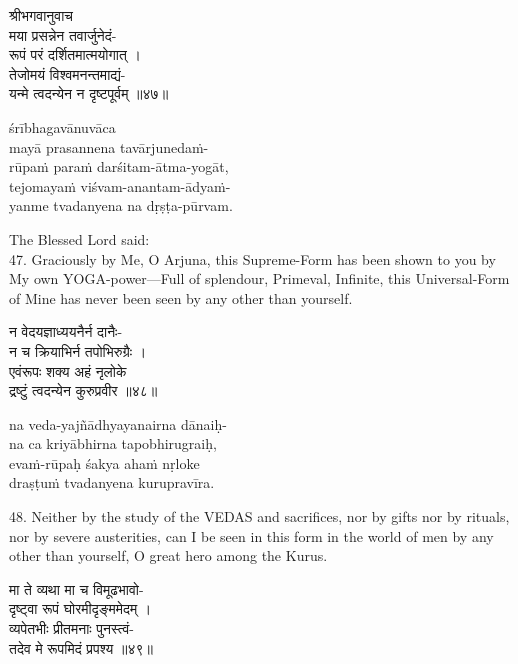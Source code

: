 \begin{gitaverse}
श्रीभगवानुवाच \\
मया प्रसन्नेन तवार्जुनेदं- \\
\tab रूपं परं दर्शितमात्मयोगात् । \\
तेजोमयं विश्वमनन्तमाद्यं- \\
\tab यन्मे त्वदन्येन न दृष्टपूर्वम् ॥४७॥
\end{gitaverse}

\begin{transliteration}
śrībhagavānuvāca \\
mayā prasannena tavārjunedaṁ- \\
\tab rūpaṁ paraṁ darśitam-ātma-yogāt, \\
tejomayaṁ viśvam-anantam-ādyaṁ- \\
\tab yanme tvadanyena na dṛṣṭa-pūrvam.
\end{transliteration}

The Blessed Lord said: \\
47. Graciously by Me, O Arjuna, this Supreme-Form has been shown to you by My
own YOGA-power---Full of splendour, Primeval, Infinite, this Universal-Form of
Mine has never been seen by any other than yourself.

\begin{gitaverse}
न वेदयज्ञाध्ययनैर्न दानैः- \\
\tab न च क्रियाभिर्न तपोभिरुग्रैः । \\
एवंरूपः शक्य अहं नृलोके \\
\tab द्रष्टुं त्वदन्येन कुरुप्रवीर ॥४८॥
\end{gitaverse}

\begin{transliteration}
na veda-yajñādhyayanairna dānaiḥ- \\
\tab na ca kriyābhirna tapobhirugraiḥ, \\
evaṁ-rūpaḥ śakya ahaṁ nṛloke \\
\tab draṣṭuṁ tvadanyena kurupravīra.
\end{transliteration}

48. Neither by the study of the VEDAS and sacrifices, nor by gifts nor by
rituals, nor by severe austerities, can I be seen in this form in the world of
men by any other than yourself, O great hero among the Kurus.

\begin{gitaverse}
मा ते व्यथा मा च विमूढभावो- \\
\tab दृष्ट्वा रूपं घोरमीदृङ्ममेदम् । \\
व्यपेतभीः प्रीतमनाः पुनस्त्वं- \\
\tab तदेव मे रूपमिदं प्रपश्य ॥४९॥
\end{gitaverse}

